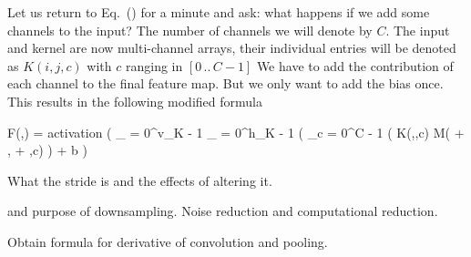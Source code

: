 \startsubsubsection[title=Multiple channels]
Let us return to Eq.~() for a minute and ask: what happens if we add some channels to the input?
The number of channels we will denote by $C$.
The input and kernel are now multi-channel arrays, their individual entries will be denoted as $K(i,j,c)$ with $c$ ranging in $[0 \, .. \, C - 1]$
We have to add the contribution of each channel to the final feature map.
But we only want to add the bias once.
This results in the following modified formula

\startplaceformula[reference=devel-feature-4]
\startformula
F(\color[red]{i},\color[red]{j}) = {\rm activation} \left( \sum_{\color[blue]{i} = 0}^{v_K - 1} \sum_{\color[blue]{j} = 0}^{h_K - 1} \left( \sum_{c = 0}^{C - 1} \Bigl( K(\color[blue]{i},\color[blue]{j},c) \cdot M(\color[red]{i} + \color[blue]{i}, \color[red]{j} + \color[blue]{j},c) \right) + b \right)
\stopformula
\stopplaceformula
\stopsubsubsection

\startsubsubsection[title=The stride]
What the stride is and the effects of altering it.
\stopsubsubsection

\startsubsubsection[title=Zero padding]
\stopsubsubsection



 and purpose of downsampling.
Noise reduction and computational reduction.
\stopsubsection

\startsubsection[title=Backward Propagation]
Obtain formula for derivative of convolution and pooling.
\stopsubsection
\stopsection